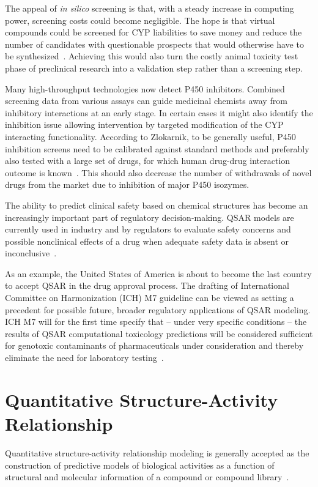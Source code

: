 The appeal of \textit{in silico} screening is that, with a steady increase in computing power, screening costs could become negligible. The hope is that virtual compounds could be screened for CYP liabilities to save money and reduce the number of candidates with questionable prospects that would otherwise have to be synthesized~\cite{Zlokarnik2005}. Achieving this would also turn the costly animal toxicity test phase of preclinical research into a validation step rather than a screening step.

Many high-throughput technologies now detect P450 inhibitors. Combined screening data from various assays can guide medicinal chemists away from inhibitory interactions at an early stage. In certain cases it might also identify the inhibition issue allowing intervention by targeted modification of the CYP interacting functionality. According to Zlokarnik, to be generally useful, P450 inhibition screens need to be calibrated against standard methods and preferably also tested with a large set of drugs, for which human drug-drug interaction outcome is known~\cite{Zlokarnik2005}. This should also decrease the number of withdrawals of novel drugs from the market due to inhibition of major P450 isozymes.

The ability to predict clinical safety based on chemical structures has become an increasingly important part of regulatory decision-making. QSAR models are currently used in industry and by regulators to evaluate safety concerns and possible nonclinical effects of a drug when adequate safety data is absent or inconclusive~\cite{Kruhlak2012}.

As an example, the United States of America is about to become the last country to accept QSAR in the drug approval process. The drafting of International Committee on Harmonization (ICH) M7 guideline can be viewed as setting a precedent for possible future, broader regulatory applications of QSAR modeling. ICH M7 will for the first time specify that -- under very specific conditions -- the results of QSAR computational toxicology predictions will be considered sufficient for genotoxic contaminants of pharmaceuticals under consideration and thereby eliminate the need for laboratory testing~\cite{Kruhlak2012}.


\section{Quantitative Structure-Activity Relationship}

Quantitative structure-activity relationship modeling is generally accepted as the construction of predictive models of biological activities as a function of structural and molecular information of a compound or compound library~\cite{Nantasenamat2009}.

